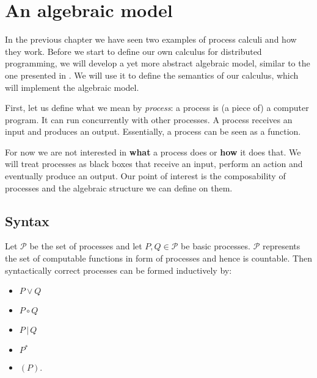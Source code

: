 \chapter{An algebraic model}
\label{chp:algebraic_model}
In the previous chapter we have seen two examples of process calculi and how they work. Before we start to define our own calculus for distributed programming, we will develop a yet more abstract algebraic model, similar to the one presented in \cite{Hoare:2012:LPU:2368298.2368301}. We will use it to define the semantics of our calculus, which will implement the algebraic model.

First, let us define what we mean by \textit{process}: a process is (a piece of) a computer program. It can run concurrently with other processes. A process receives an input and produces an output. Essentially, a process can be seen as a function. %

For now we are not interested in \textbf{what} a process does or \textbf{how} it does that. We will treat processes as black boxes that receive an input, perform an action and eventually produce an output. Our point of interest is the composability of processes and the algebraic structure we can define on them.

\section{Syntax}

Let $\mathcal{P}$ be the set of processes and let $P, Q \in \mathcal{P}$ be basic processes. $\mathcal{P}$ represents the set of computable functions in form of processes and hence is countable. Then syntactically correct processes can be formed inductively by:
\begin{itemize}
  \item $P \vee Q$
  \vspace*{-0.25em}
  \item $P \circ Q$
  \vspace*{-0.25em}
  \item $P \,|\, Q$
  \vspace*{-0.25em}
  \item $P^*$
  \vspace*{-0.25em}
  \item $\left( P \right)$.
\end{itemize}


